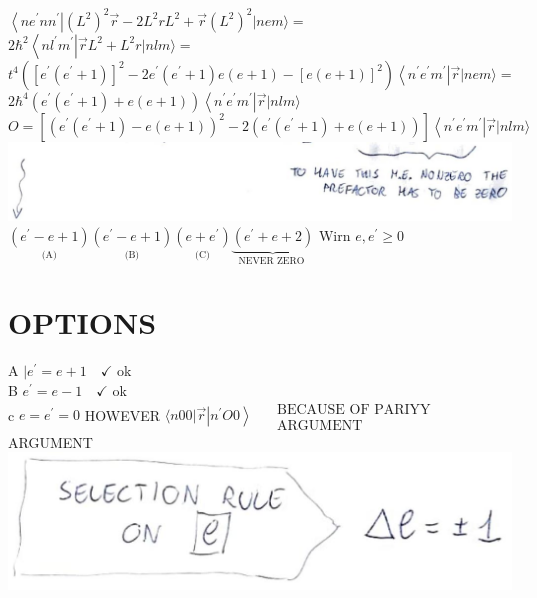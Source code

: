 \documentclass[10pt]{article}
\begin{document}
$\left\langle n e^{\prime} n n^{\prime}\right|\left(L^{2}\right)^{2} \vec{r}-2 L^{2} r L^{2}+\vec{r}\left(L^{2}\right)^{2}|n e m\rangle=$\\
$2 \hbar^{2}\left\langle n l^{\prime} m^{\prime}\right| \vec{r} L^{2}+L^{2} r|n l m\rangle=$\\
$t^{4}\left(\left[e^{\prime}\left(e^{\prime}+1\right)\right]^{2}-2 e^{\prime}\left(e^{\prime}+1\right) e(e+1)-[e(e+1)]^{2}\right)\left\langle n^{\prime} e^{\prime} m^{\prime}\right| \vec{r}|n e m\rangle=$\\
$2 \hbar^{4}\left(e^{\prime}\left(e^{\prime}+1\right)+e(e+1)\right)\left\langle n^{\prime} e^{\prime} m^{\prime}\right| \vec{r}|n l m\rangle$\\
$O=\left[\left(e^{\prime}\left(e^{\prime}+1\right)-e(e+1)\right)^{2}-2\left(e^{\prime}\left(e^{\prime}+1\right)+e(e+1)\right)\right]\left\langle n^{\prime} e^{\prime} m^{\prime}\right| \vec{r}|n l m\rangle$\\
\includegraphics[max width=\textwidth, center]{2025_10_16_22329e0f50bdd2511b17g-15}\\
$\underset{\text { (A) }}{\left(e^{\prime}-e+1\right)} \underset{\text { (B) }}{\left(e^{\prime}-e+1\right)} \underset{\text { (C) }}{\left(e+e^{\prime}\right)} \underbrace{\left(e^{\prime}+e+2\right)}_{\text {NEVER ZERO }}$ Wirn $e, e^{\prime} \geqslant 0$

\section*{OPTIONS}
A $\mid e^{\prime}=e+1 \quad \checkmark$ ok\\
B $e^{\prime}=e-1 \quad \checkmark$ ok\\
c $e=e^{\prime}=0$ HOWEVER $\langle n 00| \vec{r}\left|n^{\prime} O 0\right\rangle \quad \begin{gathered}\text { BECAUSE OF PARIYY } \\ \text { ARGUMENT }\end{gathered}$ ARGUMENT\\
\includegraphics[max width=\textwidth, center]{2025_10_16_22329e0f50bdd2511b17g-15(1)}
\end{document}
